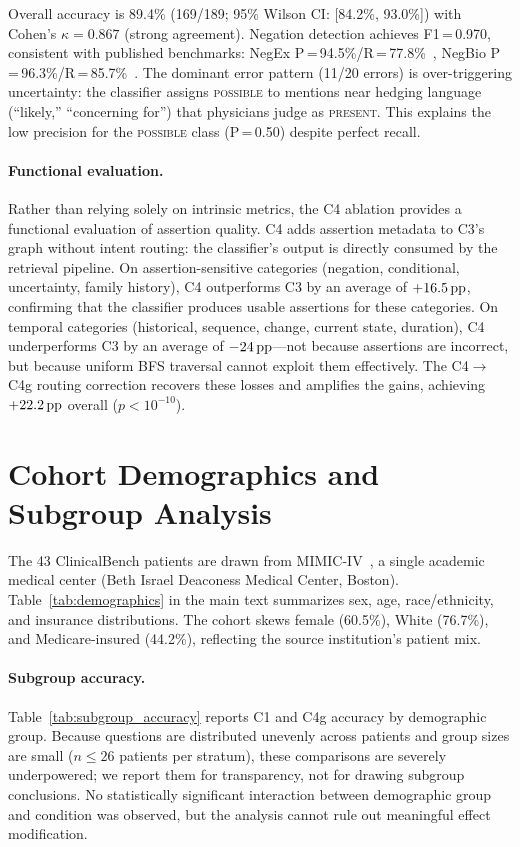 Overall accuracy is 89.4\% (169/189; 95\% Wilson CI: [84.2\%, 93.0\%]) with Cohen's $\kappa = 0.867$ (strong agreement).
Negation detection achieves F1\,=\,0.970, consistent with published benchmarks: NegEx P\,=\,94.5\%/R\,=\,77.8\%~\cite{chapman2001negex}, NegBio P\,=\,96.3\%/R\,=\,85.7\%~\cite{peng2018negbio}.
The dominant error pattern (11/20 errors) is over-triggering uncertainty: the classifier assigns \textsc{possible} to mentions near hedging language (``likely,'' ``concerning for'') that physicians judge as \textsc{present}.
This explains the low precision for the \textsc{possible} class (P\,=\,0.50) despite perfect recall.

\paragraph{Functional evaluation.}
Rather than relying solely on intrinsic metrics, the C4 ablation provides a functional evaluation of assertion quality.
C4 adds assertion metadata to C3's graph without intent routing: the classifier's output is directly consumed by the retrieval pipeline.
On assertion-sensitive categories (negation, conditional, uncertainty, family history), C4 outperforms C3 by an average of $+16.5\,\text{pp}$, confirming that the classifier produces usable assertions for these categories.
On temporal categories (historical, sequence, change, current state, duration), C4 underperforms C3 by an average of $-24\,\text{pp}$---not because assertions are incorrect, but because uniform BFS traversal cannot exploit them effectively.
The C4$\to$C4g routing correction recovers these losses and amplifies the gains, achieving $+22.2\,\text{pp}$ overall ($p < 10^{-10}$).


\section{Cohort Demographics and Subgroup Analysis}
\label{app:demographics}

The 43 ClinicalBench patients are drawn from MIMIC-IV~\cite{johnson2023mimiciv}, a single academic medical center (Beth Israel Deaconess Medical Center, Boston).
Table~\ref{tab:demographics} in the main text summarizes sex, age, race/ethnicity, and insurance distributions.
The cohort skews female (60.5\%), White (76.7\%), and Medicare-insured (44.2\%), reflecting the source institution's patient mix.

\paragraph{Subgroup accuracy.}
Table~\ref{tab:subgroup_accuracy} reports C1 and C4g accuracy by demographic group.
Because questions are distributed unevenly across patients and group sizes are small ($n \leq 26$ patients per stratum), these comparisons are severely underpowered; we report them for transparency, not for drawing subgroup conclusions.
No statistically significant interaction between demographic group and condition was observed, but the analysis cannot rule out meaningful effect modification.

